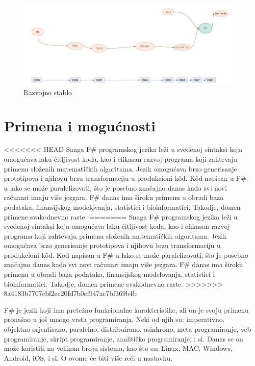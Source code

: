 \documentclass[a4paper]{article}
\begin{document}
\begin{figure}[h!]
\begin{center}
\includegraphics[scale=0.255]{stablo.jpg}
\end{center}
\caption{Razvojno stablo}
\label{fig:stablo}
\end{figure}

\section{Primena i mogućnosti}
\label{sec:primena}

<<<<<<< HEAD
Snaga F\# programskog jezika leži u svedenoj sintaksi koja omogućava laku čitljivost koda, kao i efikasan razvoj programa koji zahtevaju primenu složenih matematičkih algoritama. Jezik omogućava brzo generisanje prototipova i njihovu brzu transformaciju u produkcioni kôd. Kôd napisan u F\#-u lako se može paralelizovati, što je posebno značajno danas kada svi novi računari imaju više jezgara. F\# danas ima široku primenu u obradi baza podataka, finansijskog modelovanja, statistici i bioinformatici. Takodje, domen primene svakodnevno raste.
=======
Snaga F\# programskog jezika leži u svedenoj sintaksi koja omogućava laku čitljivost koda, kao i efikasan razvoj programa koji zahtevaju primenu složenih matematičkih algoritama. Jezik omogućava brzo generisanje prototipova i njihovu brzu transformaciju u produkcioni kôd. Kod napisan u F\#-u lako se može paralelizovati, što je posebno značajno danas kada svi novi računari imaju više jezgara. F\# danas ima široku primenu u obradi baza podataka, finansijskog modelovanja, statistici i bioinformatici. Takodje, domen primene svakodnevno raste.
>>>>>>> 8a4183b7707cbf2ec20fd7b0cf947ac7bf369b4b

F\# je jezik koji ima pretežno funkcionalne karakteristike, ali on je svoju primenu pronašao u još mnogo vrsta programiranja. Neki od njih su: imperativno, objektno-orjentisano, paralelno, distribuirano, asinhrono, meta programiranje, veb programiranje, skript programiranje, analitičko programiranje, i sl. Danas se on može koristiti na velikom broju sistema, kao što su: Linux, MAC, Windows, Android, iOS, i sl. O ovome će biti više reči u nastavku. 
\end{document}
